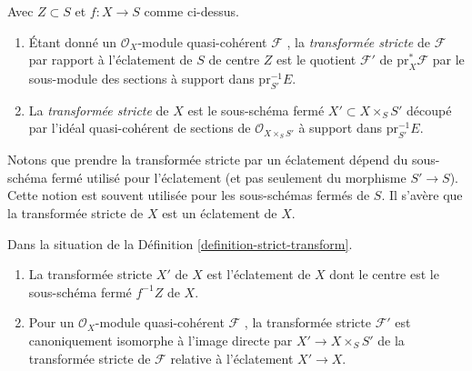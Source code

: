 \begin{definition}
\label{definition-strict-transform}
Avec  $Z \subset S$  et  $f : X \to S$  comme ci-dessus.
\begin{enumerate}
\item Étant donné un  $\mathcal{O}_X$-module quasi-cohérent  $\mathcal{F}$ , la
 {\it  transformée stricte}  de  $\mathcal{F}$  par
rapport à l'éclatement de  $S$  de centre  $Z$  est le quotient  $\mathcal{F}'$
de  $\text{pr}_X^*\mathcal{F}$  par le sous-module des sections à support dans  $\text{pr}_{S'}^{-1}E$.
\item La  {\it transformée stricte}  de  $X$ est
le sous-schéma fermé $X' \subset X \times_S S'$  découpé par l'idéal quasi-cohérent de sections de
 $\mathcal{O}_{X \times_S S'}$ à support dans $\text{pr}_{S'}^{-1}E$.
\end{enumerate}
\end{definition}

\noindent
Notons que prendre la transformée stricte par un éclatement dépend du
sous-schéma fermé utilisé pour l'éclatement (et pas seulement du
morphisme $S' \to S$). Cette notion est souvent utilisée pour les sous-schémas
fermés de  $S$. Il s'avère que la transformée stricte de  $X$  est
un éclatement de  $X$.

\begin{lemma}
\label{lemma-strict-transform}
Dans la situation de la Définition  \ref{definition-strict-transform}.
\begin{enumerate}
\item La transformée stricte $X'$  de  $X$  est l'éclatement de
 $X$ dont le centre est le sous-schéma fermé $f^{-1}Z$  de  $X$.
\item Pour un  $\mathcal{O}_X$-module quasi-cohérent  $\mathcal{F}$ , la transformée stricte
 $\mathcal{F}'$  est canoniquement isomorphe à l'image directe par  $X' \to X \times_S S'$ 
de la transformée stricte de  $\mathcal{F}$  relative à l'éclatement  $X' \to X$.
\end{enumerate}
\end{lemma}

